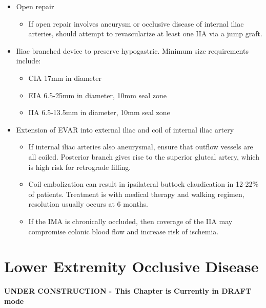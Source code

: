 \documentclass[
]{book}
\providecommand{\tightlist}{%
  \setlength{\itemsep}{0pt}\setlength{\parskip}{0pt}}
\begin{document}
\begin{itemize}
\item
  Open repair

  \begin{itemize}
  \tightlist
  \item
    If open repair involves aneurysm or occlusive disease of
    internal iliac arteries, should attempt to revascularize at
    least one IIA via a jump graft.\citep{krupski1998, huang2008}
  \end{itemize}
\item
  Iliac branched device to preserve hypogastric. Minimum size
  requirements include:

  \begin{itemize}
  \item
    CIA 17mm in diameter
  \item
    EIA 6.5-25mm in diameter, 10mm seal zone
  \item
    IIA 6.5-13.5mm in diameter, 10mm seal zone\citep{schneider2017}
  \end{itemize}
\item
  Extension of EVAR into external iliac and coil of internal iliac
  artery

  \begin{itemize}
  \item
    If internal iliac arteries also aneurysmal, ensure that outflow
    vessels are all coiled. Posterior branch gives rise to the
    superior gluteal artery, which is high risk for retrograde
    filling.\citep{ryer2012}
  \item
    Coil embolization can result in ipsilateral buttock claudication
    in 12-22\% of patients. Treatment is with medical therapy and
    walking regimen, resolution usually occurs at 6
    months.\citep{papazoglou2012, stokmans2013}
  \item
    If the IMA is chronically occluded, then coverage of the IIA may
    compromise colonic blood flow and increase risk of
    ischemia.\citep{angiletta2011, karch2000}
  \end{itemize}
\end{itemize}

\hypertarget{lower-extremity-occlusive-disease}{%
\chapter{Lower Extremity Occlusive Disease}\label{lower-extremity-occlusive-disease}}

\textbf{UNDER CONSTRUCTION - This Chapter is Currently in DRAFT mode}
\end{document}
